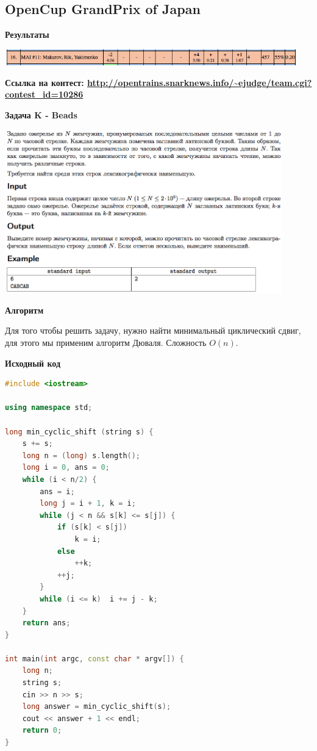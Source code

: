 \documentclass[a4paper,12pt]{article}
\begin{document}
\subsection{OpenCup GrandPrix of Japan}

\textbf{{\large Результаты}} \\
\begin{center}
\includegraphics[width=0.95\textwidth]{OC_Japan/OC_Japan_result.png}\\ [1cm]
\end{center}

\textbf{{\large Ссылка на контест: \url{http://opentrains.snarknews.info/~ejudge/team.cgi?contest_id=10286}}}

\newpage
\textbf{{\large Задача K - Beads}}

\begin{center}
\includegraphics[width=0.9\textwidth]{OC_Japan/OC_Japan_K.png}\\ [1cm]
\end{center}

\textbf{{\large Алгоритм}}

Для того чтобы решить задачу, нужно найти минимальный циклический сдвиг, для этого мы применим алгоритм Дюваля. Сложность $O(n)$.

\newpage
\textbf{{\large Исходный код}} \\
\begin{lstlisting}[language=C++]
#include <iostream>

using namespace std;

long min_cyclic_shift (string s) {
    s += s;
    long n = (long) s.length();
    long i = 0, ans = 0;
    while (i < n/2) {
        ans = i;
        long j = i + 1, k = i;
        while (j < n && s[k] <= s[j]) {
            if (s[k] < s[j])
                k = i;
            else
                ++k;
            ++j;
        }
        while (i <= k)  i += j - k;
    }
    return ans;
}

int main(int argc, const char * argv[]) {
    long n;
    string s;
    cin >> n >> s;
    long answer = min_cyclic_shift(s);
    cout << answer + 1 << endl;
    return 0;
}
\end{lstlisting}
\end{document}
